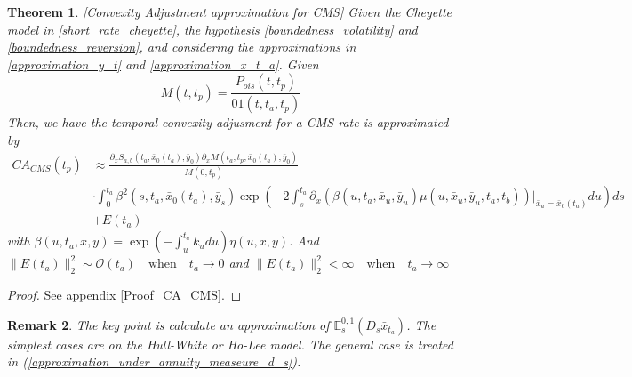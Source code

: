 \documentclass[a4paper,10pt]{article}
\newtheorem{theorem}{Theorem}[section]
\newtheorem{remark}[theorem]{Remark}
\newcommand{\1}{\mathbf{1}}
\begin{document}
\begin{theorem}\label{Th_CA_CMS}[Convexity Adjustment approximation for CMS]
Given the Cheyette model in \eqref{short_rate_cheyette}, the hypothesis \ref{boundedness_volatility} and \ref{boundedness_reversion}, and considering the approximations in \eqref{approximation_y_t} and \eqref{approximation_x_t_a}. Given
\begin{equation}
M(t,t_p)= \frac{P_{ois}(t,t_p)}{01(t,t_a,t_p)}
\end{equation}
Then, we have the temporal convexity adjusment for a CMS rate is approximated by
\begin{align} \label{cms_first_order_convexity}
CA_{CMS}(t_p) &\approx \frac{\partial_x S_{a,b}(t_a,\bar{x}_0(t_a), \bar{y}_0) \partial_x M(t_a,t_p,\bar{x}_0(t_a), \bar{y}_0)}{M(0,t_p)} \nonumber \\
&\cdot \int_{0}^{t_a}  \beta^2(s,t_a,\bar{x}_0(t_a),\bar{y}_s) \exp\left(-2\int_{s}^{t_a}\partial_x (\beta(u,t_a,\bar{x}_u,\bar{y}_u) \mu(u,\bar{x}_u, \bar{y}_u,t_a,t_b))|_{\bar{x}_u=\bar{x}_{0}(t_a)}  du \right)ds \nonumber \\
&+ E(t_a)
\end{align}
with  $\beta(u,t_a,x,y) = \exp\left(-\int_{u}^{t_a}k_u du\right)\eta(u,x,y)$. And $\|E(t_a)\|^{2}_{2} \sim \mathcal{O}(t_a) \quad \text{when} \quad t_a \to 0$ and $\|E(t_a)\|^{2}_{2} < \infty \quad \text{when} \quad t_a \to \infty$
\end{theorem}
\begin{proof}
See appendix \ref{Proof_CA_CMS}.
\end{proof}

\begin{remark}
The key point is calculate an approximation of $\mathbb{E}_s^{0,1}\left( D_s \bar{x}_{t_a}\right)$. The simplest cases are on the Hull-White or Ho-Lee model. The general case is treated in (\ref{approximation_under_annuity_measeure_d_s}). 
\end{remark}
\end{document}
